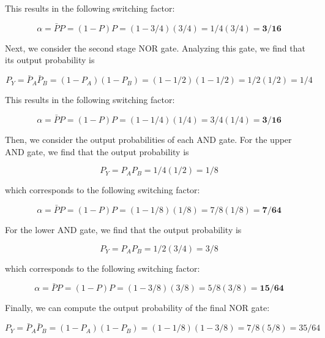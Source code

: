 \documentclass[fleqn]{article}
\begin{document}
\begin{enumerate}
\begin{enumerate}
			This results in the following switching factor:
			
			\begin{equation*}
				\alpha = \bar{P}P = (1 - P)P = (1 - 3/4)(3/4) = 1/4(3/4) = \mathbf{3/16}
			\end{equation*}
			
			Next, we consider the second stage NOR gate. Analyzing this gate, we find that its output probability is
			
			\begin{equation*}
				P_Y = \bar{P}_A\bar{P}_B = (1 - P_A)(1 - P_B) = (1 - 1/2)(1 - 1/2) = 1/2(1/2) = 1/4
			\end{equation*}
			
			This results in the following switching factor:
			
			\begin{equation*}
				\alpha = \bar{P}P = (1 - P)P = (1 - 1/4)(1/4) = 3/4(1/4) = \mathbf{3/16}
			\end{equation*}
			
			Then, we consider the output probabilities of each AND gate. For the upper AND gate, we find that the output probability is
			
			\begin{equation*}
				P_Y = P_AP_B = 1/4(1/2) = 1/8
			\end{equation*}
			
			which corresponds to the following switching factor:
			
			\begin{equation*}
				\alpha = \bar{P}P = (1 - P)P = (1 - 1/8)(1/8) = 7/8(1/8) = \mathbf{7/64}
			\end{equation*}
			
			For the lower AND gate, we find that the output probability is
			
			\begin{equation*}
				P_Y = P_AP_B = 1/2(3/4) = 3/8
			\end{equation*}
			
			which corresponds to the following switching factor:
			
			\begin{equation*}
				\alpha = \bar{P}P = (1 - P)P = (1 - 3/8)(3/8) = 5/8(3/8) = \mathbf{15/64}
			\end{equation*}
			
			Finally, we can compute the output probability of the final NOR gate:
			
			\begin{equation*}
				P_Y = \bar{P}_A\bar{P}_B = (1 - P_A)(1 - P_B) = (1 - 1/8)(1 - 3/8) = 7/8(5/8) = 35/64
			\end{equation*}
			

\end{enumerate}
\end{enumerate}
\end{document}

